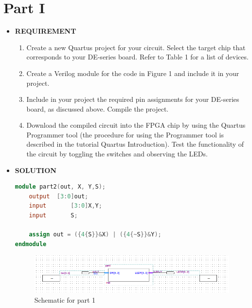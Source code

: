 \documentclass[a4paper, 12pt]{report}
\begin{document}
\section{Part I }
\begin{itemize}
    \item [] \textbf{REQUIREMENT}
        \begin{enumerate}
            \item Create a new Quartus project for your circuit. Select the target chip that corresponds to your DE-series board. Refer to Table 1 for a list of devices.
            \item Create a Verilog module for the code in Figure 1 and include it in your project.
            \item Include in your project the required pin assignments for your DE-series board, as discussed above. Compile the project.
            \item Download the compiled circuit into the FPGA chip by using the Quartus Programmer tool (the procedure for using the Programmer tool is described in the tutorial Quartus Introduction). Test the functionality of the circuit by toggling the switches and observing the LEDs.
        \end{enumerate}
    \item [] \textbf{SOLUTION}
            \begin{lstlisting}[language=verilog]
module part2(out, X, Y,S);
    output	[3:0]out;
    input		[3:0]X,Y;
    input		S;
    
    assign out = ({4{S}}&X) | ({4{~S}}&Y);
endmodule
            \end{lstlisting}
             \begin{figure}[h]
                \centering
                \includegraphics[scale = 0.9]{source/picture/Lab1/Lab1_1.png}
                \caption{Schematic for part 1}
            \end{figure}
\end{itemize}
\clearpage
\end{document}
